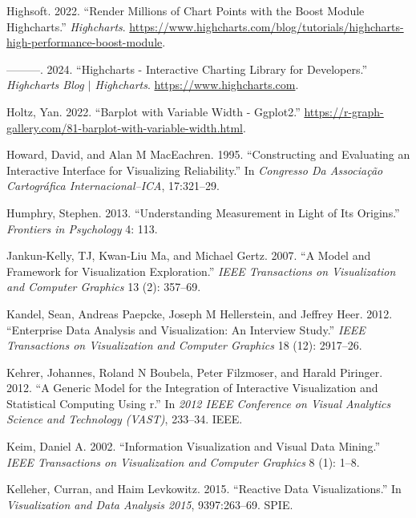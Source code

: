 \documentclass[
]{book}
\newlength{\cslhangindent}
\newenvironment{CSLReferences}[2] %
 {\begin{list}{}{%
  \setlength{\itemindent}{0pt}
  \setlength{\leftmargin}{0pt}
  \setlength{\parsep}{0pt}
  \ifodd #1
   \setlength{\leftmargin}{\cslhangindent}
   \setlength{\itemindent}{-1\cslhangindent}
  \fi
  \setlength{\itemsep}{#2\baselineskip}}}
 {\end{list}}
\begin{document}
\begin{CSLReferences}{1}{0}
Highsoft. 2022. {``Render Millions of Chart Points with the Boost Module {\textendash} Highcharts.''} \emph{Highcharts}. \url{https://www.highcharts.com/blog/tutorials/highcharts-high-performance-boost-module}.

---------. 2024. {``Highcharts - Interactive Charting Library for Developers.''} \emph{Highcharts Blog {\(\vert\)} Highcharts}. \url{https://www.highcharts.com}.

Holtz, Yan. 2022. {``Barplot with Variable Width - Ggplot2.''} \url{https://r-graph-gallery.com/81-barplot-with-variable-width.html}.

Howard, David, and Alan M MacEachren. 1995. {``Constructing and Evaluating an Interactive Interface for Visualizing Reliability.''} In \emph{Congresso Da Associa{ç}{ã}o Cartogr{á}fica Internacional--ICA}, 17:321--29.

Humphry, Stephen. 2013. {``Understanding Measurement in Light of Its Origins.''} \emph{Frontiers in Psychology} 4: 113.

Jankun-Kelly, TJ, Kwan-Liu Ma, and Michael Gertz. 2007. {``A Model and Framework for Visualization Exploration.''} \emph{IEEE Transactions on Visualization and Computer Graphics} 13 (2): 357--69.

Kandel, Sean, Andreas Paepcke, Joseph M Hellerstein, and Jeffrey Heer. 2012. {``Enterprise Data Analysis and Visualization: An Interview Study.''} \emph{IEEE Transactions on Visualization and Computer Graphics} 18 (12): 2917--26.

Kehrer, Johannes, Roland N Boubela, Peter Filzmoser, and Harald Piringer. 2012. {``A Generic Model for the Integration of Interactive Visualization and Statistical Computing Using r.''} In \emph{2012 IEEE Conference on Visual Analytics Science and Technology (VAST)}, 233--34. IEEE.

Keim, Daniel A. 2002. {``Information Visualization and Visual Data Mining.''} \emph{IEEE Transactions on Visualization and Computer Graphics} 8 (1): 1--8.

Kelleher, Curran, and Haim Levkowitz. 2015. {``Reactive Data Visualizations.''} In \emph{Visualization and Data Analysis 2015}, 9397:263--69. SPIE.


\end{CSLReferences}
\end{document}
